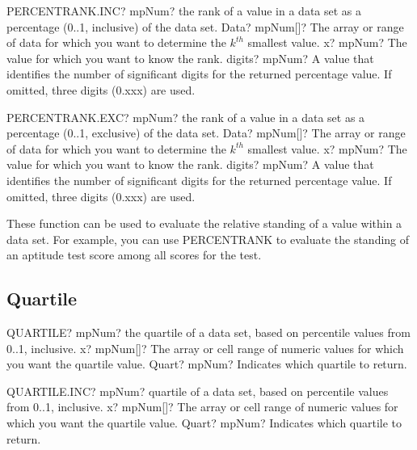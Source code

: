 \vspace{0.6cm}
\begin{mpFunctionsExtract}
	\mpWorksheetFunctionThreeNotImplemented
	{PERCENTRANK.INC? mpNum? the rank of a value in a data set as a percentage (0..1, inclusive) of the data set.}
	{Data? mpNum[]?  The array or range of data for which you want to determine the $k^{th}$ smallest  value.}
	{x? mpNum? The value for which you want to know the rank.}
	{digits? mpNum? A value that identifies the number of significant digits for the returned percentage value. If omitted, three digits (0.xxx) are used.}
\end{mpFunctionsExtract}

\vspace{0.6cm}
\begin{mpFunctionsExtract}
	\mpWorksheetFunctionThreeNotImplemented
	{PERCENTRANK.EXC? mpNum? the rank of a value in a data set as a percentage (0..1, exclusive) of the data set.}
	{Data? mpNum[]?  The array or range of data for which you want to determine the $k^{th}$ smallest  value.}
	{x? mpNum? The value for which you want to know the rank.}
	{digits? mpNum? A value that identifies the number of significant digits for the returned percentage value. If omitted, three digits (0.xxx) are used.}
\end{mpFunctionsExtract}

\vspace{0.3cm}
These function can be used to evaluate the relative standing of a value within a data set. For example, you can use \textsf{PERCENTRANK} to evaluate the standing of an aptitude test score among all scores for the test.






\subsection{Quartile}


\begin{mpFunctionsExtract}
	\mpWorksheetFunctionTwoNotImplemented
	{QUARTILE? mpNum? the quartile of a data set, based on percentile values from 0..1, inclusive.}
	{x? mpNum[]?  The array or cell range of numeric values for which you want the quartile value.}
	{Quart? mpNum? Indicates which quartile to return.}
\end{mpFunctionsExtract}


\vspace{0.6cm}
\begin{mpFunctionsExtract}
	\mpWorksheetFunctionTwoNotImplemented
	{QUARTILE.INC? mpNum? quartile of a data set, based on percentile values from 0..1, inclusive.}
	{x? mpNum[]?  The array or cell range of numeric values for which you want the quartile value.}
	{Quart? mpNum? Indicates which quartile to return.}
\end{mpFunctionsExtract}


